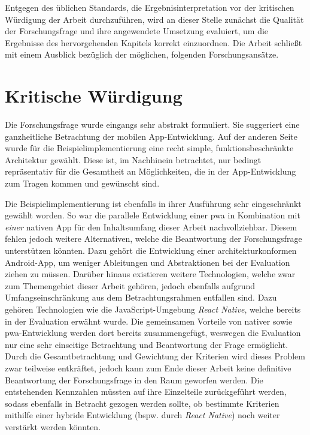 Entgegen des üblichen Standards, die Ergebnisinterpretation vor der kritischen Würdigung der Arbeit durchzuführen, wird an dieser Stelle zunächst die Qualität der Forschungsfrage und ihre angewendete Umsetzung evaluiert, um die Ergebnisse des hervorgehenden Kapitels korrekt einzuordnen. Die Arbeit schließt mit einem Ausblick bezüglich der möglichen, folgenden Forschungsansätze.

\section{Kritische Würdigung}
Die Forschungsfrage wurde eingangs sehr abstrakt formuliert. Sie suggeriert eine ganzheitliche Betrachtung der mobilen App-Entwicklung. Auf der anderen Seite wurde für die Beispielimplementierung eine recht simple, funktionsbeschränkte Architektur gewählt. Diese ist, im Nachhinein betrachtet, nur bedingt repräsentativ für die Gesamtheit an Möglichkeiten, die in der App-Entwicklung zum Tragen kommen und gewünscht sind.

Die Beispielimplementierung ist ebenfalls in ihrer Ausführung sehr eingeschränkt gewählt worden. So war die parallele Entwicklung einer \ac{pwa} in Kombination mit \textit{einer} nativen App für den Inhaltsumfang dieser Arbeit nachvollziehbar. Diesem fehlen jedoch weitere Alternativen, welche die Beantwortung der Forschungsfrage unterstützen könnten. Dazu gehört die Entwicklung einer architekturkonformen Android-App, um weniger Ableitungen und Abstraktionen bei der Evaluation ziehen zu müssen. Darüber hinaus existieren weitere Technologien, welche zwar zum Themengebiet dieser Arbeit gehören, jedoch ebenfalls aufgrund Umfangseinschränkung aus dem Betrachtungsrahmen entfallen sind. Dazu gehören Technologien wie die JavaScript-Umgebung \textit{React Native}, welche bereits in der Evaluation erwähnt wurde. Die gemeinsamen Vorteile von nativer sowie \ac{pwa}-Entwicklung werden dort bereits zusammengefügt, weswegen die Evaluation nur eine sehr einseitige Betrachtung und Beantwortung der Frage ermöglicht. Durch die Gesamtbetrachtung und Gewichtung der Kriterien wird dieses Problem zwar teilweise entkräftet, jedoch kann zum Ende dieser Arbeit keine definitive Beantwortung der Forschungsfrage in den Raum geworfen werden. Die entstehenden Kennzahlen müssten auf ihre Einzelteile zurückgeführt werden, sodass ebenfalls in Betracht gezogen werden sollte, ob bestimmte Kriterien mithilfe einer hybride Entwicklung (bspw. durch \textit{React Native}) noch weiter verstärkt werden könnten.

